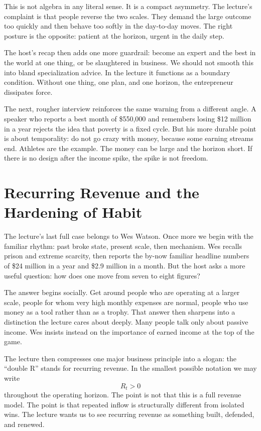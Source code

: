 This is not algebra in any literal sense. It is a compact asymmetry. The lecture's complaint is that people reverse the two scales. They demand the large outcome too quickly and then behave too softly in the day-to-day moves. The right posture is the opposite: patient at the horizon, urgent in the daily step.

The host's recap then adds one more guardrail: become an expert and the best in the world at one thing, or be slaughtered in business. We should not smooth this into bland specialization advice. In the lecture it functions as a boundary condition. Without one thing, one plan, and one horizon, the entrepreneur dissipates force.

The next, rougher interview reinforces the same warning from a different angle. A speaker who reports a best month of \$550{,}000 and remembers losing \$12 million in a year rejects the idea that poverty is a fixed cycle. But his more durable point is about temporality: do not go crazy with money, because some earning streams end. Athletes are the example. The money can be large and the horizon short. If there is no design after the income spike, the spike is not freedom.

\section{Recurring Revenue and the Hardening of Habit}

The lecture's last full case belongs to Wes Watson. Once more we begin with the familiar rhythm: past broke state, present scale, then mechanism. Wes recalls prison and extreme scarcity, then reports the by-now familiar headline numbers of \$24 million in a year and \$2.9 million in a month. But the host asks a more useful question: how does one move from seven to eight figures?

The answer begins socially. Get around people who are operating at a larger scale, people for whom very high monthly expenses are normal, people who use money as a tool rather than as a trophy. That answer then sharpens into a distinction the lecture cares about deeply. Many people talk only about passive income. Wes insists instead on the importance of earned income at the top of the game.

The lecture then compresses one major business principle into a slogan: the ``double R'' stands for recurring revenue. In the smallest possible notation we may write
\begin{equation}
R_t > 0
\end{equation}
throughout the operating horizon. The point is not that this is a full revenue model. The point is that repeated inflow is structurally different from isolated wins. The lecture wants us to see recurring revenue as something built, defended, and renewed.

